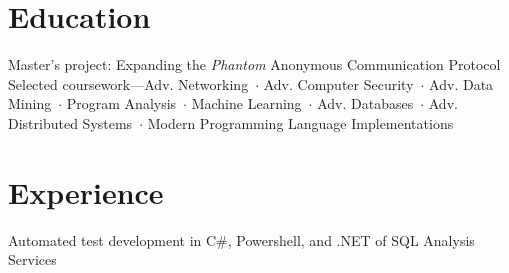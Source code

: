 \documentclass{resume}
\begin{document}
\maketitle
\thispagestyle{empty}

\section{Education}
\begin{school}
{Master's project:} {\sffamily Expanding the \emph{Phantom} Anonymous Communication Protocol}\\
Selected coursework---Adv. Networking~$\cdot$ Adv. Computer Security~$\cdot$ Adv. Data Mining~$\cdot$ Program Analysis~$\cdot$ Machine Learning~$\cdot$ Adv. Databases~$\cdot$ Adv. Distributed Systems~$\cdot$ Modern Programming Language Implementations
\end{school}

\begin{school}
\end{school}

\begin{school}
\end{school}

\section{Experience}
\begin{position}
	\item Automated test development in C\#, Powershell, and .NET of SQL Analysis Services
\end{position}
\end{document}
